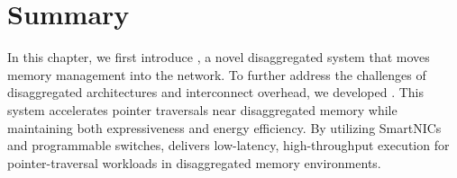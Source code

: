 \section{Summary}
\label{sec:pulsefuture}

In this chapter, we first introduce \mind, a novel disaggregated system that moves memory management into the network. To further address the challenges of disaggregated architectures and interconnect overhead, we developed \pulse. This system accelerates pointer traversals near disaggregated memory while maintaining both expressiveness and energy efficiency. By utilizing SmartNICs and programmable switches, \pulse delivers low-latency, high-throughput execution for pointer-traversal workloads in disaggregated memory environments.



